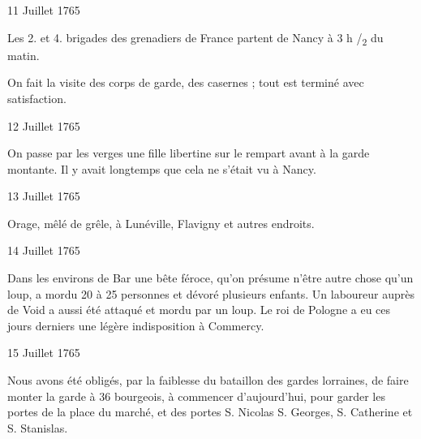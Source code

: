                      \begin{diary}{11 Juillet 1765}{}

                         Les 2. et 4. brigades des grenadiers de
                           France partent de Nancy à 3 h
                              /\textsubscript{2} du matin. \bigskip


                         On fait la visite des corps de garde,
                           des
                           casernes ; tout est terminé avec satisfaction. \bigskip


                     \end{diary}

                     \begin{diary}{12 Juillet 1765}{}

                         On passe par les verges une fille libertine
                           sur le rempart avant
                           à la garde montante. Il y avait longtemps
                           que cela ne s'était vu à Nancy. \bigskip


                     \end{diary}

                     \begin{diary}{13 Juillet 1765}{}

                         Orage, mêlé de grêle, à Lunéville, Flavigny
                           et autres endroits. \bigskip


                     \end{diary}

                     \begin{diary}{14 Juillet 1765}{}

                         Dans les environs de Bar une bête féroce,
                           qu'on présume n'être autre chose qu'un loup,
                           a mordu 20 à 25 personnes et dévoré
                           plusieurs enfants. Un laboureur auprès de
                               Void a aussi été attaqué et mordu par
                           un loup. Le roi de Pologne a eu ces jours
                           derniers une légère indisposition à Commercy. \bigskip


                     \end{diary}

                     \begin{diary}{15 Juillet 1765}{}

                         Nous avons été obligés, par la
                           faiblesse
                           du bataillon des gardes lorraines, de faire monter
                           la garde à 36 bourgeois, à commencer
                           d'aujourd'hui, pour garder les portes de la
                              place du marché, et des portes S. Nicolas
                           S. Georges,
                              S.
                              Catherine et S. Stanislas. \bigskip


                     \end{diary}

